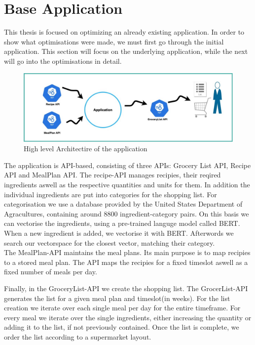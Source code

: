 
\chapter{Base Application}\label{chapter:base_application}

This thesis is focused on optimizing an already existing application. In order to show what optimisations were made, we must first go through the initial application.
This section will focus on the underlying application, while the next will go into the optimisations in detail.\\

\begin{figure}
	\centering
	\includegraphics[scale=0.4]{Figures/architecture.jpg}
	\caption[Application Architecture]{High level Architectire of the application}\label{fig:arch}
\end{figure}
The application is API-based, consisting of three APIs: Grocery List API, Recipe API and MealPlan API. The recipe-API manages recipies, their reqired ingredients aswell as the respective quantities and units for them. In addition the individual ingredients are put into categories for the shopping list. For categorisation we use a database provided by the  United States Department of Agracultures, containing around 8800 ingredient-category pairs. On this basis we can vectorise the ingredients, using a pre-trained languge model called BERT. When a new ingredient is added, we vectorise it with BERT. Afterwords we search our vectorspace for the closest vector, matching their category.\\

The MealPlan-API maintains the meal plans. Its main purpose is to map recipies to a stored meal plan. The API maps the recipies for a fixed timeslot aswell as a fixed  number of meals per day.

Finally, in the GroceryList-API we create the shopping list. The GrocerList-API generates the list for a given meal plan and timeslot(in weeks). For the list creation we iterate over each single meal per day for the entire timeframe.
For every meal we iterate over the single ingredients, either increasing the quantity or adding it to the list, if not previously contained. Once the list is complete, we order the list according to a supermarket layout.

